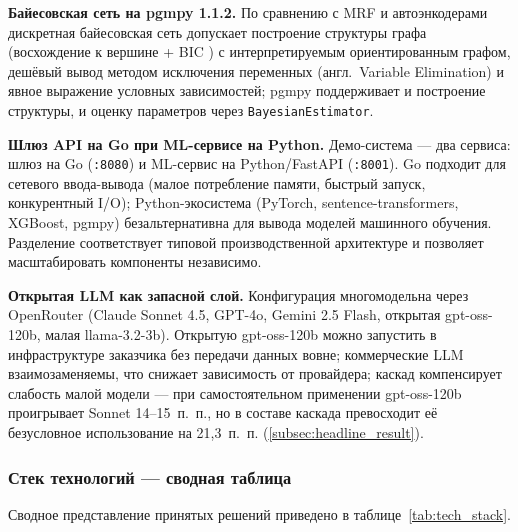 \textbf{Байесовская сеть на pgmpy \cite{ref_35} 1.1.2.} По сравнению с MRF и автоэнкодерами дискретная байесовская сеть допускает построение структуры графа (восхождение к вершине + BIC \cite{ref_36}) с интерпретируемым ориентированным графом, дешёвый вывод методом исключения переменных (англ.\ Variable Elimination) и явное выражение условных зависимостей; pgmpy поддерживает и построение структуры, и оценку параметров через \texttt{BayesianEstimator}.

\textbf{Шлюз API на Go при ML-сервисе на Python.} Демо-система — два сервиса: шлюз на Go (\texttt{:8080}) и ML-сервис на Python/FastAPI (\texttt{:8001}). Go подходит для сетевого ввода-вывода (малое потребление памяти, быстрый запуск, конкурентный I/O); Python-экосистема (PyTorch, sentence-transformers, XGBoost, pgmpy) безальтернативна для вывода моделей машинного обучения. Разделение соответствует типовой производственной архитектуре и позволяет масштабировать компоненты независимо.

\textbf{Открытая LLM как запасной слой.} Конфигурация многомодельна через OpenRouter (Claude Sonnet 4.5, GPT-4o, Gemini 2.5 Flash, открытая gpt-oss-120b, малая llama-3.2-3b). Открытую gpt-oss-120b можно запустить в инфраструктуре заказчика без передачи данных вовне; коммерческие LLM взаимозаменяемы, что снижает зависимость от провайдера; каскад компенсирует слабость малой модели — при самостоятельном применении gpt-oss-120b проигрывает Sonnet 14--15~п.~п., но в составе каскада превосходит её безусловное использование на 21,3~п.~п. (\ref{subsec:headline_result}).

\subsubsection{Стек технологий — сводная таблица}
\label{subsubsec:tech_stack}

Сводное представление принятых решений приведено в таблице~\ref{tab:tech_stack}.

